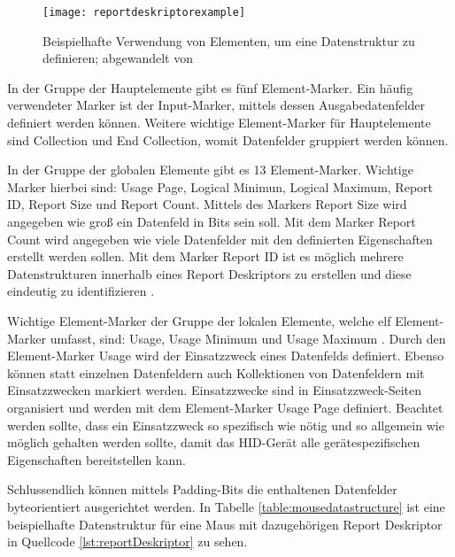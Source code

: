 \begin{figure}[H]
    \centering
    \texttt{[image: reportdeskriptorexample]}
    \caption{Beispielhafte Verwendung von Elementen, um eine Datenstruktur zu definieren; abgewandelt von \cite[S.~24]{usbHIDS}}
    \label{fig:reportdeskriptorexample}
\end{figure}

In der Gruppe der Hauptelemente gibt es fünf Element-Marker. Ein häufig verwendeter Marker ist der Input-Marker, mittels dessen Ausgabedatenfelder definiert werden können. Weitere wichtige Element-Marker für Hauptelemente sind Collection und End Collection, womit Datenfelder gruppiert werden können. \cite[S.~23f., S.~30ff.]{usbHIDS}

In der Gruppe der globalen Elemente gibt es 13 Element-Marker. Wichtige Marker hierbei sind: Usage Page, Logical Minimun, Logical Maximum, Report ID, Report Size und Report Count. Mittels des Markers Report Size wird angegeben wie groß ein Datenfeld in Bits sein soll. Mit dem Marker Report Count wird angegeben wie viele Datenfelder mit den definierten Eigenschaften erstellt werden sollen. Mit dem Marker Report ID ist es möglich mehrere Datenstrukturen innerhalb eines Report Deskriptors zu erstellen und diese eindeutig zu identifizieren \cite[S.~17]{usbHIDS}. \cite[S.~35ff.]{usbHIDS}

Wichtige Element-Marker der Gruppe der lokalen Elemente, welche elf Element-Marker umfasst, sind: Usage, Usage Minimum und Usage Maximum \cite[S.~40]{usbHIDS}. Durch den Element-Marker Usage wird der Einsatzzweck eines Datenfelds definiert. Ebenso können statt einzelnen Datenfeldern auch Kollektionen von Datenfeldern mit Einsatzzwecken markiert werden. Einsatzzwecke sind in Einsatzzweck-Seiten organisiert und werden mit dem Element-Marker Usage Page definiert. Beachtet werden sollte, dass ein Einsatzzweck so spezifisch wie nötig und so allgemein wie möglich gehalten werden sollte, damit das \acs{HID}-Gerät alle gerätespezifischen Eigenschaften bereitstellen kann. \cite[S.~15f.]{usbHIDt}

Schlussendlich können mittels Padding-Bits die enthaltenen Datenfelder byteorientiert ausgerichtet werden. In Tabelle \ref{table:mousedatastructure} ist eine beispielhafte Datenstruktur für eine Maus mit dazugehörigen Report Deskriptor in Quellcode \ref{lst:reportDeskriptor} zu sehen.

